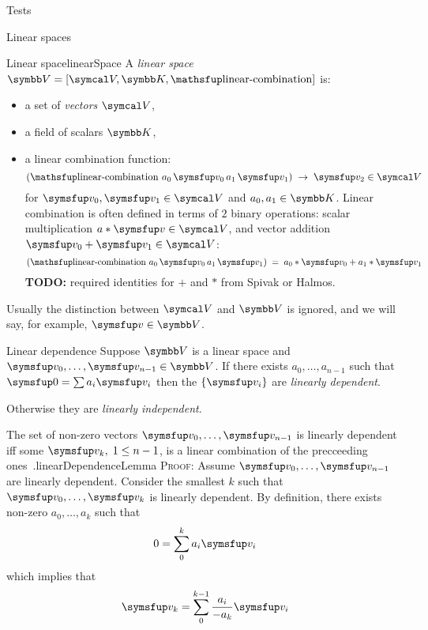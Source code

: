 \documentclass{PalisadesLakesArticle}
\begin{document}
\begin{plSection}{Tests}
\begin{plSection}{Linear spaces}
\begin{plDefinition}{Linear space}{linearSpace}
A \textit{linear space} 
$\Space{V} = 
\left[ \Set{V}, \Space{K}, \linearCombination \right]$
 is:
\begin{itemize}
  \item a set of \textit{vectors} $\Set{V}$,
  \item a field  of scalars $\Space{K}$,
  \item a linear combination function: 
\begin{equation}
\left( \linearCombination 
\, a_0 \, \Vector{v}_0 \, a_1 \, \Vector{v}_1 \right) \; 
 \rightarrow \; \Vector{v}_2  \in \Set{V}
\end{equation}
for $\Vector{v}_0, \Vector{v}_1 \in \Set{V} $
and $a_0, a_1 \in \Space{K}$.
Linear combination is often defined in terms of
$2$ binary operations:
scalar multiplication $a * \Vector{v} \in \Set{V}$,
and vector addition $\Vector{v}_0 + \Vector{v}_1 \in \Set{V}$:
\begin{equation}
\left( \linearCombination 
\, a_0 \, \Vector{v}_0 \, a_1 \, \Vector{v}_1 \right) \; 
= \; a_0*\Vector{v}_0 + a_1*\Vector{v}_1
\end{equation}
\textbf{TODO:} required identities for $+$ and $*$ 
from Spivak or Halmos.
\end{itemize}
\end{plDefinition}

Usually the distinction between $\Set{V}$ and $\Space{V}$ 
is ignored, and we will say, for example, 
$\Vector{v} \in \Space{V}$.

\begin{plDefinition}{Linear dependence}{}
Suppose $\Space{V}$ is a linear space and
$\Vector{v}_0, \ldots , \Vector{v}_{n-1} \in \Space{V}$.
If there exists $a_0, \ldots , a_{n-1}$ such that
$\Vector{0} = \sum a_i \Vector{v}_i$ then the $\{ \Vector{v}_i \}$
are \textit{linearly dependent}.
\cite[section~5]{Halmos:1958:Finite}

Otherwise they are \textit{linearly independent}.
\end{plDefinition}

\begin{plLemma}{The set of non-zero vectors
 $\Vector{v}_0, \ldots ,\Vector{v}_{n-1}$
is linearly dependent iff some $\Vector{v}_k, \; 1 \leq n-1$, 
is a linear combination of the precceeding 
ones~\cite[Section 6]{Halmos:1958:Finite}.}{linearDependenceLemma}
\textsc{Proof:}
Assume  $\Vector{v}_0, \ldots ,\Vector{v}_{n-1}$ are linearly dependent.
Consider the smallest $k$ such that 
$\Vector{v}_0, \ldots ,\Vector{v}_{k}$ is linearly dependent.
By definition,
there exists non-zero $a_0, \ldots ,a_{k}$ such that
\begin{equation}
0 = \sum_0^k a_i \Vector{v}_i
\end{equation}
which implies that
\begin{equation}
\Vector{v}_k = \sum_0^{k-1} \frac{a_i}{- a_k} \Vector{v}_i
\end{equation}
\end{plLemma}


\end{plSection}
\end{plSection}
\end{document}

